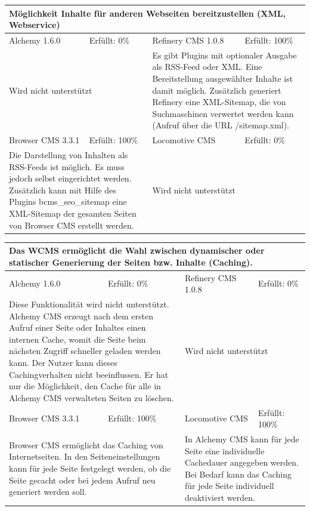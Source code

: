 \newline
\begin{tabular}[!ht]{|l|l|l|l|}
\hline
\multicolumn{4}{|p{15cm}|}{\textbf{Möglichkeit Inhalte für anderen Webseiten bereitzustellen (XML, Webservice)}} \\
\hline
  Alchemy 1.6.0 & \cellcolor{red}Erfüllt: 0\% & Refinery CMS 1.0.8 & \cellcolor{green}Erfüllt: 100\% \\
  \hline
  \multicolumn{2}{|p{7.5cm}|}{Wird nicht unterstützt} & \multicolumn{2}{p{7.5cm}|}{Es gibt Plugins mit optionaler Ausgabe als RSS-Feed oder XML. Eine Bereitstellung ausgewählter Inhalte ist damit möglich. Zusätzlich generiert Refinery eine XML-Sitemap, die von Suchmaschinen verwertet werden kann (Aufruf über die URL /sitemap.xml).} \\
  \hline
  Browser CMS 3.3.1 & \cellcolor{green}Erfüllt: 100\% & Locomotive CMS & \cellcolor{red}Erfüllt: 0\% \\
  \hline
  \multicolumn{2}{|p{7.5cm}|}{Die Darstellung von Inhalten als RSS-Feeds ist möglich. Es muss jedoch selbst eingerichtet werden. Zusätzlich kann mit Hilfe des Plugins bcms\_seo\_sitemap eine XML-Sitemap der gesamten Seiten von Browser CMS erstellt werden.} & \multicolumn{2}{p{7.5cm}|}{Wird nicht unterstützt} \\
\hline
\end{tabular}
\newline
\newline
\newline
\begin{tabular}[!ht]{|l|l|l|l|}
\hline
\multicolumn{4}{|p{15cm}|}{\textbf{Das WCMS ermöglicht die Wahl zwischen dynamischer oder statischer Generierung der Seiten bzw. Inhalte (Caching).}} \\
\hline
  Alchemy 1.6.0 & \cellcolor{red}Erfüllt: 0\% & Refinery CMS 1.0.8 & \cellcolor{red}Erfüllt: 0\% \\
  \hline
  \multicolumn{2}{|p{7.5cm}|}{Diese Funktionalität wird nicht unterstützt. Alchemy CMS erzeugt nach dem ersten Aufruf einer Seite oder Inhaltes einen internen Cache, womit die Seite beim nächsten Zugriff schneller geladen werden kann. Der Nutzer kann dieses Cachingverhalten nicht beeinflussen. Er hat nur die Möglichkeit, den Cache für alle in Alchemy CMS verwalteten Seiten zu löschen.} & \multicolumn{2}{p{7.5cm}|}{Wird nicht unterstützt} \\
  \hline
  Browser CMS 3.3.1 & \cellcolor{green}Erfüllt: 100\% & Locomotive CMS & \cellcolor{green}Erfüllt: 100\% \\
  \hline
  \multicolumn{2}{|p{7.5cm}|}{Browser CMS ermöglicht das Caching von Internetseiten. In den Seiteneinstellungen kann für jede Seite festgelegt werden, ob die Seite gecacht oder bei jedem Aufruf neu generiert werden soll.} & \multicolumn{2}{p{7.5cm}|}{In Alchemy CMS kann für jede Seite eine individuelle Cachedauer angegeben werden. Bei Bedarf kann das Caching für jede Seite individuell deaktiviert werden.} \\
\hline
\end{tabular}
